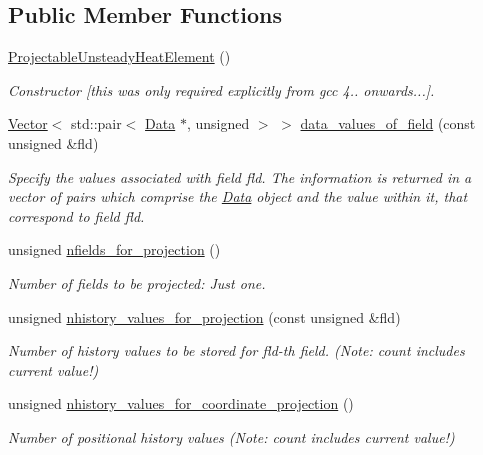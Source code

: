 \subsection*{Public Member Functions}
\begin{DoxyCompactItemize}
\item 
\hyperlink{classoomph_1_1ProjectableUnsteadyHeatElement_a0c06505ffcefcceaddf84905b5a8c1ce}{Projectable\+Unsteady\+Heat\+Element} ()
\begin{DoxyCompactList}\small\item\em Constructor \mbox{[}this was only required explicitly from gcc 4.. onwards...\mbox{]}. \end{DoxyCompactList}\item 
\hyperlink{classoomph_1_1Vector}{Vector}$<$ std\+::pair$<$ \hyperlink{classoomph_1_1Data}{Data} $\ast$, unsigned $>$ $>$ \hyperlink{classoomph_1_1ProjectableUnsteadyHeatElement_a5e80bbc5a4d70f51fe842bb90f988d31}{data\+\_\+values\+\_\+of\+\_\+field} (const unsigned \&fld)
\begin{DoxyCompactList}\small\item\em Specify the values associated with field fld. The information is returned in a vector of pairs which comprise the \hyperlink{classoomph_1_1Data}{Data} object and the value within it, that correspond to field fld. \end{DoxyCompactList}\item 
unsigned \hyperlink{classoomph_1_1ProjectableUnsteadyHeatElement_a8966da6a379eb20fcf86efe03c681a86}{nfields\+\_\+for\+\_\+projection} ()
\begin{DoxyCompactList}\small\item\em Number of fields to be projected\+: Just one. \end{DoxyCompactList}\item 
unsigned \hyperlink{classoomph_1_1ProjectableUnsteadyHeatElement_ac26bb5fe73e07db80e7e4e7a2070074c}{nhistory\+\_\+values\+\_\+for\+\_\+projection} (const unsigned \&fld)
\begin{DoxyCompactList}\small\item\em Number of history values to be stored for fld-\/th field. (Note\+: count includes current value!) \end{DoxyCompactList}\item 
unsigned \hyperlink{classoomph_1_1ProjectableUnsteadyHeatElement_a1fcd0a7808f65c0ffde81c1e23d0e1c1}{nhistory\+\_\+values\+\_\+for\+\_\+coordinate\+\_\+projection} ()
\begin{DoxyCompactList}\small\item\em Number of positional history values (Note\+: count includes current value!) \end{DoxyCompactList}\item 

\end{DoxyCompactItemize}
